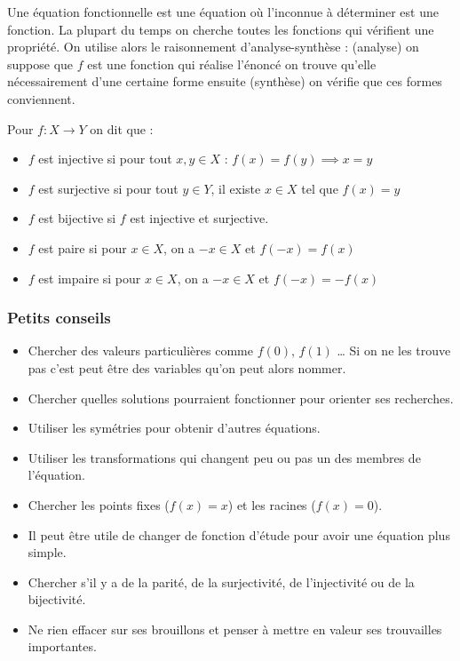 \begin{rappel}
Une équation fonctionnelle est une équation où l'inconnue à déterminer est une fonction. La plupart du temps on cherche toutes les fonctions qui vérifient une propriété. On utilise alors le raisonnement d'analyse-synthèse : (analyse) on suppose que $f$ est une fonction qui réalise l'énoncé on trouve qu'elle nécessairement d'une certaine forme ensuite (synthèse) on vérifie que ces formes conviennent.
\end{rappel}
\begin{rappel}
Pour $f : X\to Y$ on dit que :
\begin{itemize}
    \item $f$ est injective si pour tout $x,y\in X$ : $f(x)=f(y)\implies x=y$
    \item $f$ est surjective si pour tout $y\in Y$, il existe $x\in X$ tel que $f(x)=y$
    \item $f$ est bijective si $f$ est injective et surjective.
    \item $f$ est paire si pour $x\in X$, on a $-x\in X$ et $f(-x)=f(x)$
    \item $f$ est impaire si pour $x\in X$, on a $-x\in X$ et $f(-x)=-f(x)$
\end{itemize}
\end{rappel}

\subsubsection{Petits conseils}

\begin{itemize}
    \item Chercher des valeurs particulières comme $f(0)$, $f(1)$ … Si on ne les trouve pas c'est peut être des variables qu'on peut alors nommer.
    \item Chercher quelles solutions pourraient fonctionner pour orienter ses recherches.
    \item Utiliser les symétries pour obtenir d'autres équations.
    \item Utiliser les transformations qui changent peu ou pas un des membres de l'équation.
    \item Chercher les points fixes ($f(x)=x$) et les racines ($f(x)=0$).
    \item Il peut être utile de changer de fonction d'étude pour avoir une équation plus simple.
    \item Chercher s'il y a de la parité, de la surjectivité, de l'injectivité ou de la bijectivité.
    \item Ne rien effacer sur ses brouillons et penser à mettre en valeur ses trouvailles importantes.
\end{itemize}


